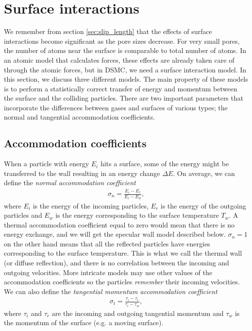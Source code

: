 \section{Surface interactions}
\label{sec:surface_interactions}
We remember from section \ref{sec:slip_length} that the effects of surface interactions become significant as the pore sizes decrease. For very small pores, the number of atoms near the surface is comparable to total number of atoms. In an atomic model that calculates forces, these effects are already taken care of through the atomic forces, but in DSMC, we need a surface interaction model. In this section, we discuss three different models. The main property of these models is to perform a statistically correct transfer of energy and momentum between the surface and the colliding particles. There are two important parameters that incorporate the differences between gases and surfaces of various types; the normal and tangential accommodation coefficients.
\subsection{Accommodation coefficients}
\label{sec:accomodation_coefficients}
When a particle with energy $E_i$ hits a surface, some of the energy might be transferred to the wall resulting in an energy change $\Delta E$. On average, we can define the \textit{normal accommodation coefficient} 
\begin{align}
	\sigma_n = \frac{E_i - E_r}{E_i - E_w},
\end{align}
where $E_i$ is the energy of the incoming particles, $E_r$ is the energy of the outgoing particles and $E_w$ is the energy corresponding to the surface temperature $T_w$. A thermal accommodation coefficient equal to zero would mean that there is no energy exchange, and we will get the specular wall model described below. $\sigma_n=1$ on the other hand means that all the reflected particles have energies corresponding to the surface temperature. This is what we call the thermal wall (or diffuse reflection\cite{karniadakis2005microflows}), and there is no correlation between the incoming and outgoing velocities. More intricate models may use other values of the accommodation coefficients so the particles \textit{remember} their incoming velocities. We can also define the \textit{tangential momentum accommodation coefficient}
\begin{align}
	\sigma_t = \frac{\tau_i - \tau_r}{\tau_i - \tau_w},
\end{align}
where $\tau_i$ and $\tau_r$ are the incoming and outgoing tangential momentum and $\tau_w$ is the momentum of the surface (e.g. a moving surface). 

